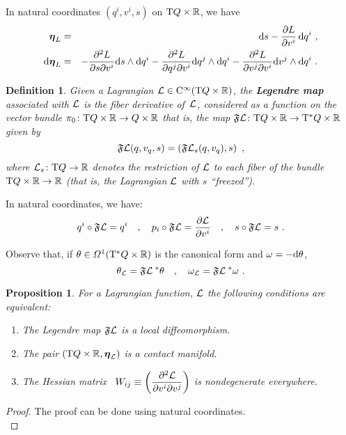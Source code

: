 \documentclass[12pt]{report}
\newtheorem{prop}[teor]{Proposition}
\newtheorem{definition}[teor]{Definition}
\def\beann{\begin{eqnarray*}}
\def\eeann{\end{eqnarray*}}
\def\dst{\displaystyle}
\def\derpar#1#2{\frac{\partial{#1}}{\partial{#2}}}
\def\qed{\ifvmode\removelastskip\fi
{\unskip\nobreak\hfil\penalty50\hbox{}\nobreak\hfil
\hbox{\vrule height1.2ex width1.2ex}\parfillskip=0pt
\finalhyphendemerits=0 \par\smallskip}}
\def\df{{\mit\Omega}}
\def\Lag{{\cal L}}
\def\d{{\rm d}}
\def\Real{\mathbb{R}}
\def\bmeta{\mbox{\boldmath $\eta$}}
\def\Tan{{\rm T}}
\def\Cinfty{{\rm C}^\infty}
\begin{document}
In natural coordinates $(q^i, v^i, s)$ on $\Tan Q\times\Real$, we have
\beann
\bmeta_L&=&\d s-\frac{\partial L}{\partial v^i} \,\d q^i \ ,
\\ %
\d\bmeta_L&=& 
-\frac{\partial^2L}{\partial s\partial v^i}\d s\wedge\d q^i 
-\frac{\partial^2L}{\partial q^j\partial v^i}\d q^j\wedge\d q^i 
-\frac{\partial^2L}{\partial v^j\partial v^i}\d v^j\wedge\d q^i\ .
\eeann

\begin{definition}
\label{legmap1}
Given a Lagrangian 
$\Lag\in\Cinfty(\Tan Q\times\Real)$, the {\sl \textbf{Legendre map}}
associated with $\Lag$ is the fiber derivative of~$\Lag$,
considered as a function on the vector bundle
$\pi_0 \colon\Tan Q\times\Real\to Q\times\Real$
that is, the map
$\mathfrak{F}\Lag\colon\Tan Q\times\Real \to\Tan^*Q\times\Real$ 
given by
$$
\mathfrak{F}\Lag (q,v_q,s) = \left(\mathfrak{F}\Lag_s (q,v_q),s\right)
\ ,
$$
where $\Lag_s\colon\Tan Q\to\Real$ denotes the restriction of $\Lag$ to each fiber of the bundle $\Tan Q\times\Real\to\Real$
(that is, the Lagrangian $\Lag$ with $s$ ``freezed'').
\end{definition}

In natural coordinates, we have:
$$
q^i \circ \mathfrak{F}\Lag = q^i \quad , \quad p_i \circ \mathfrak{F}\Lag =\derpar{\Lag}{v^i} \quad , \quad s \circ \mathfrak{F}\Lag = s \ .
$$

Observe that, if $\theta\in\df^1(\Tan^*Q\times\Real)$ 
is the canonical form and $\omega=-\d\theta$, 
$$
\theta_\Lag=\mathfrak{F}\Lag^{\;*}\theta\quad , \quad\omega_\Lag=\mathfrak{F}\Lag^{\;*}\omega\ .
$$

\begin{prop}
\label{Prop-regLag}
For a Lagrangian function, $\Lag$ the following conditions are equivalent:
\begin{enumerate}
\item
The Legendre map
$\mathfrak{F}\Lag$ is a local diffeomorphism.
\item 
The pair $(\Tan Q\times\Real,\bmeta_\Lag)$ is a contact manifold.
\item 
The Hessian matrix \ $\dst W_{ij}\equiv\left(\frac{\partial^2\Lag}{\partial v^i\partial v^j}\right)$ is nondegenerate everywhere.
\end{enumerate}
\end{prop}
\begin{proof}
The proof can be done using natural coordinates.
\\ \qed\end{proof}
\end{document}
